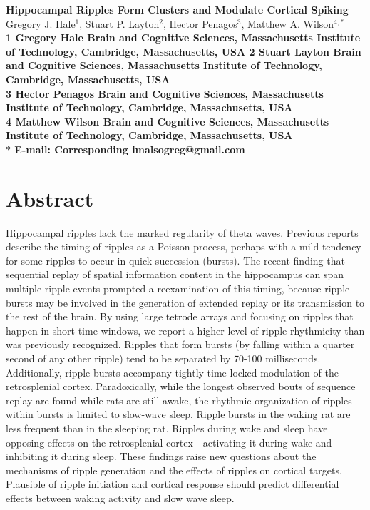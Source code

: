 \documentclass[10pt]{article}
\date{}
\begin{document}
\begin{flushleft}
{\Large
\textbf{Hippocampal Ripples Form Clusters and Modulate Cortical Spiking}
}
\\
Gregory J. Hale$^{1}$, 
Stuart P. Layton$^{2}$, 
Hector Penagos$^{3}$, 
Matthew A. Wilson$^{4,\ast}$
\\
\bf{1} Gregory Hale Brain and Cognitive Sciences, Massachusetts Institute of Technology, Cambridge, Massachusetts, USA
\bf{2} Stuart Layton Brain and Cognitive Sciences, Massachusetts Institute of Technology, Cambridge, Massachusetts, USA
\\
\bf{3} Hector Penagos Brain and Cognitive Sciences, Massachusetts Institute of Technology, Cambridge, Massachusetts, USA
\\
\bf{4} Matthew Wilson Brain and Cognitive Sciences, Massachusetts Institute of Technology, Cambridge, Massachusetts, USA
\\
$\ast$ E-mail: Corresponding imalsogreg@gmail.com
\end{flushleft}

\section*{Abstract}
Hippocampal ripples lack the marked regularity of theta waves.  Previous reports describe the timing of ripples as a Poisson process, perhaps with a mild tendency for some ripples to occur in quick succession (bursts).  The recent finding that sequential replay of spatial information content in the hippocampus can span multiple ripple events prompted a reexamination of this timing, because ripple bursts may be involved in the generation of extended replay or its transmission to the rest of the brain.
By using large tetrode arrays and focusing on ripples that happen in short time windows, we report a higher level of ripple rhythmicity than was previously recognized.  Ripples that form bursts (by falling within a quarter second of any other ripple) tend to be separated by 70-100 milliseconds.  Additionally, ripple bursts accompany tightly time-locked modulation of the retrosplenial cortex.
Paradoxically, while the longest observed bouts of sequence replay are found while rats are still awake, the rhythmic organization of ripples within bursts is limited to slow-wave sleep.  Ripple bursts in the waking rat are less frequent than in the sleeping rat.  Ripples during wake and sleep have opposing effects on the retrosplenial cortex - activating it during wake and inhibiting it during sleep.
These findings raise new questions about the mechanisms of ripple generation and the effects of ripples on cortical targets.  Plausible of ripple initiation and cortical response should predict differential effects between waking activity and slow wave sleep.
\end{document}
